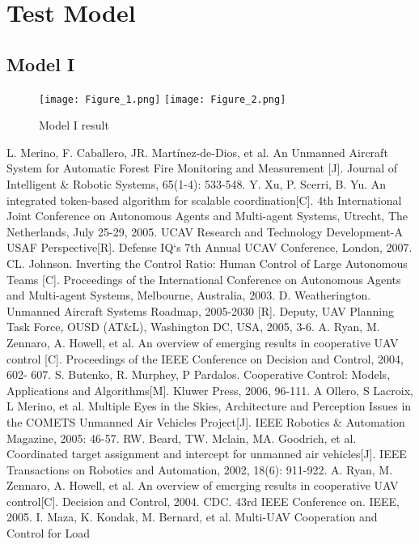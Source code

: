 \documentclass{mcmthesis}
\begin{document}
\section{Test Model}
\subsection{Model I}
\begin{figure}[h]
\small
\centering
\texttt{[image: Figure\_1.png]}
\texttt{[image: Figure\_2.png]}
\caption{Model I result} \label{fig:Model I result}
\end{figure}

\begin{thebibliography}{99}
\bibitem L. Merino, F. Caballero, JR. Martínez-de-Dios, et al. An Unmanned Aircraft System for
Automatic Forest Fire Monitoring and Measurement [J]. Journal of Intelligent \& Robotic
Systems, 65(1-4): 533-548.
\bibitem Y. Xu, P. Scerri, B. Yu. An integrated token-based algorithm for scalable coordination[C].
4th International Joint Conference on Autonomous Agents and Multi-agent Systems, Utrecht,
The Netherlands, July 25-29, 2005.
\bibitem UCAV Research and Technology Development-A USAF Perspective[R]. Defense IQ`s 7th
Annual UCAV Conference, London, 2007.
\bibitem CL. Johnson. Inverting the Control Ratio: Human Control of Large Autonomous Teams
[C]. Proceedings of the International Conference on Autonomous Agents and Multi-agent
Systems, Melbourne, Australia, 2003.
\bibitem D. Weatherington. Unmanned Aircraft Systems Roadmap, 2005-2030 [R]. Deputy, UAV
Planning Task Force, OUSD (AT\&L), Washington DC, USA, 2005, 3-6.
\bibitem A. Ryan, M. Zennaro, A. Howell, et al. An overview of emerging results in cooperative
UAV control [C]. Proceedings of the IEEE Conference on Decision and Control, 2004, 602-
607.
\bibitem S. Butenko, R. Murphey, P Pardalos. Cooperative Control: Models, Applications and
Algorithms[M]. Kluwer Press, 2006, 96-111.
\bibitem A Ollero, S Lacroix, L Merino, et al. Multiple Eyes in the Skies, Architecture and
Perception Issues in the COMETS Unmanned Air Vehicles Project[J]. IEEE Robotics \&
Automation Magazine, 2005: 46-57.
\bibitem RW. Beard, TW. Mclain, MA. Goodrich, et al. Coordinated target assignment and intercept
for unmanned air vehicles[J]. IEEE Transactions on Robotics and Automation, 2002, 18(6):
911-922.
\bibitem A. Ryan, M. Zennaro, A. Howell, et al. An overview of emerging results in cooperative
UAV control[C]. Decision and Control, 2004. CDC. 43rd IEEE Conference on. IEEE, 2005.
\bibitem I. Maza, K. Kondak, M. Bernard, et al. Multi-UAV Cooperation and Control for Load

\end{thebibliography}
\end{document}
